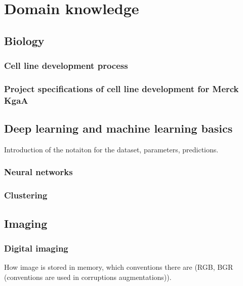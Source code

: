 \section{Domain knowledge}
    \subsection{Biology}
        \subsubsection{Cell line development process}
        
        \subsubsection{Project specifications of cell line development for Merck KgaA}
        
    \subsection{Deep learning and machine learning basics}
        Introduction of the notaiton for the dataset, parameters, predictions.
        \subsubsection{Neural networks}
            
        \subsubsection{Clustering}
            
    \subsection{Imaging}
        \subsubsection{Digital imaging}
            How image is stored in memory, which conventions there are (RGB, BGR (conventions are used in corruptions augmentations)).
